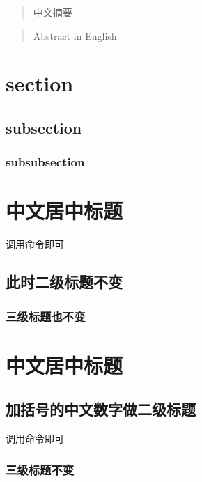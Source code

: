\documentclass{myreport}
\begin{document}
\begin{center}
	\tableofcontents
\end{center}
\newpage
\setcounter{page}{1}

\begin{abstract}
  中文摘要\MyTitle
\end{abstract}

\begin{abstract}
	Abstract in English
\end{abstract}

\section{section}
\subsection{subsection}
\subsubsection{subsubsection}

\cheineseCenterSection
\section{中文居中标题}
	调用命令即可
	\subsection{此时二级标题不变}
		\subsubsection{三级标题也不变}

\section{中文居中标题}
		\chineseSubsection
		\subsection{加括号的中文数字做二级标题}
			调用命令即可
			\subsubsection{三级标题不变}
\end{document}

